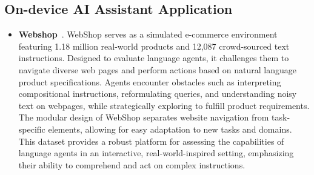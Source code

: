 \subsection{On-device AI Assistant Application}
\begin{itemize}
    \item \textbf{Webshop}~\cite{yao2022webshop}. WebShop serves as a simulated e-commerce environment featuring 1.18 million real-world products and 12,087 crowd-sourced text instructions. Designed to evaluate language agents, it challenges them to navigate diverse web pages and perform actions based on natural language product specifications. Agents encounter obstacles such as interpreting compositional instructions, reformulating queries, and understanding noisy text on webpages, while strategically exploring to fulfill product requirements. The modular design of WebShop separates website navigation from task-specific elements, allowing for easy adaptation to new tasks and domains. This dataset provides a robust platform for assessing the capabilities of language agents in an interactive, real-world-inspired setting, emphasizing their ability to comprehend and act on complex instructions.
\end{itemize}


